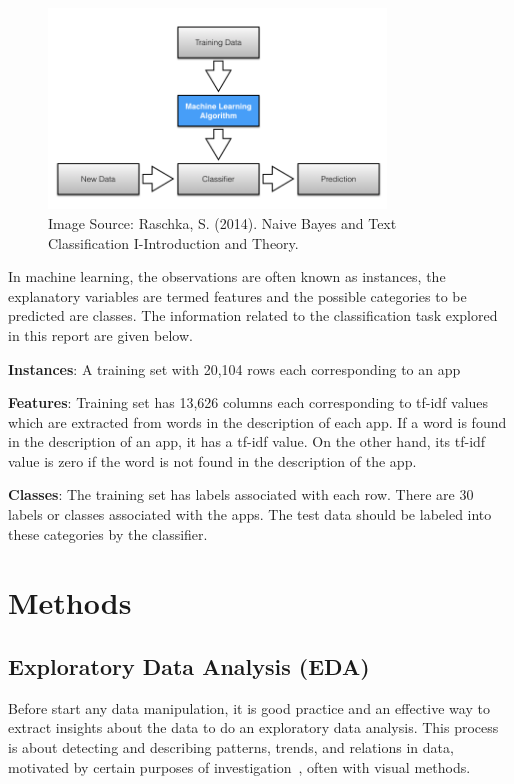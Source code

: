 \documentclass[letterpaper,10pt]{article}
\theoremstyle{mytheor}
\begin{document}
\begin{figure}[H]
\includegraphics[width=0.8\textwidth]{learning_algorithm_1}
\centering
\caption{Image Source: Raschka, S. (2014). Naive Bayes and Text Classification I-Introduction and Theory.}
\label{fig:1}
\end{figure}

In machine learning, the observations are often known as instances, the explanatory variables are termed features and the possible categories to be predicted are classes. The information related to the classification task explored in this report are given below.

\textbf{Instances}: A training set with 20,104 rows each corresponding to an app

\textbf{Features}: Training set has 13,626 columns each corresponding to tf-idf values which are extracted from words in the description of each app. If a word is found in the description of an app, it has a tf-idf value. On the other hand, its tf-idf value is zero if the word is not found in the description of the app.

\textbf{Classes}: The training set has labels associated with each row. There are 30 labels or classes associated with the apps. The test data should be labeled into these categories by the classifier.  

\section{Methods}

\subsection{Exploratory Data Analysis (EDA)}

Before start any data manipulation, it is good practice and an effective way to extract insights about the data to do an exploratory data analysis. This process is about detecting and describing patterns, trends, and relations in data, motivated by certain purposes of investigation~\cite{andrienko2006exploratory}, often with visual methods. 
\end{document}
